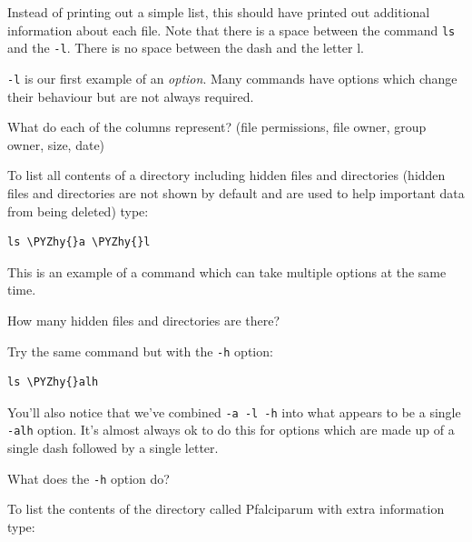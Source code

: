 \documentclass[11pt]{article}
\makeatletter
\def\PYZhy{\char`\-}
\newcommand{\boxspacing}{\kern\kvtcb@left@rule\kern\kvtcb@boxsep}
\newcommand{\prompt}[4]{
        {\ttfamily\llap{{\color{blue}\LARGE\faKeyboardO\hspace{3pt}#4}}\vspace{-\baselineskip}}
    }
\makeatother
\begin{document}
    Instead of printing out a simple list, this should have printed out
additional information about each file. Note that there is a space
between the command \texttt{ls} and the \texttt{-l}. There is no space
between the dash and the letter l.

\texttt{-l} is our first example of an \textit{option}. Many commands have
options which change their behaviour but are not always required.

What do each of the columns represent? (file permissions, file owner,
group owner, size, date)

    To list all contents of a directory including hidden files and
directories (hidden files and directories are not shown by default and
are used to help important data from being deleted) type:

    \begin{tcolorbox}[breakable, size=fbox, boxrule=1pt, pad at break*=1mm,colback=cellbackground, colframe=cellborder]
\prompt{In}{incolor}{ }{\boxspacing}
\begin{Verbatim}[commandchars=\\\{\}]
ls \PYZhy{}a \PYZhy{}l
\end{Verbatim}
\end{tcolorbox}

    This is an example of a command which can take multiple options at the
same time.

How many hidden files and directories are there?

    Try the same command but with the \texttt{-h} option:

    \begin{tcolorbox}[breakable, size=fbox, boxrule=1pt, pad at break*=1mm,colback=cellbackground, colframe=cellborder]
\prompt{In}{incolor}{ }{\boxspacing}
\begin{Verbatim}[commandchars=\\\{\}]
ls \PYZhy{}alh
\end{Verbatim}
\end{tcolorbox}

    You'll also notice that we've combined \texttt{-a\ -l\ -h} into what
appears to be a single \texttt{-alh} option. It's almost always ok to do
this for options which are made up of a single dash followed by a single
letter.

What does the \texttt{-h} option do?

    To list the contents of the directory called Pfalciparum with extra
information type:
\end{document}
